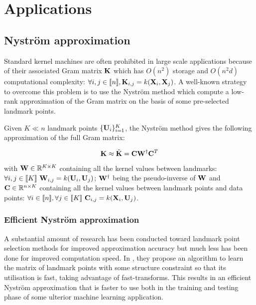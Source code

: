 \documentclass{article}
\begin{document}
\section{Applications}
\label{sec:uses}

\subsection{Nyström approximation}

Standard kernel machines are often prohibited in large scale applications because of their associated Gram matrix ${\mathbf{K}}$ which has $O(n^2)$ storage and $O(n^2d)$ computational complexity: $\forall i,j \in [\![n]\!], {\mathbf{K}}_{i,j} = k({\mathbf{X}}_i, {\mathbf{X}}_j)$. A well-known strategy to overcome this problem is to use the Nyström method which compute a low-rank approximation of the Gram matrix on the basis of some pre-selected landmark points. 

Given $K \ll n$ landmark points $\{{\mathbf{U}}_i\}_{i=1}^{K}$, the Nyström method gives the following approximation of the full Gram matrix:

\begin{equation}
 \label{eq:nystrom}
 {\mathbf{K}} \approx \tilde{{\mathbf{K}}} = {\mathbf{C}}{\mathbf{W}}^\dagger{\mathbf{C}}^T
\end{equation}

with ${\mathbf{W}} \in \mathbb{R}^{K \times K}$ containing all the kernel values between landmarks: $\forall i,j \in [\![K]\!]~ {\mathbf{W}}_{i,j} = k({\mathbf{U}}_i, {\mathbf{U}}_j)$; ${\mathbf{W}}^\dagger$ being the pseudo-inverse of ${\mathbf{W}}$ and ${\mathbf{C}} \in \mathbb{R}^{n \times K}$ containing all the kernel values between landmark points and data points: $\forall i \in [\![n]\!], \forall j \in [\![K]\!]~ {\mathbf{C}}_{i, j} = k({\mathbf{X}}_i, {\mathbf{U}}_j)$.

\subsubsection{Efficient Nyström approximation}

A substantial amount of research has been conducted toward landmark point selection methods for improved approximation accuracy \cite{kumar2012sampling} \cite{musco2017recursive} but much less has been done for improved computation speed. In \cite{si2016computationally}, they propose an algorithm to learn the matrix of landmark points with some structure constraint so that its utilisation is fast, taking advantage of fast-transforms. This results in an efficient Nyström approximation that is faster to use both in the training and testing phase of some ulterior machine learning application.
\end{document}
